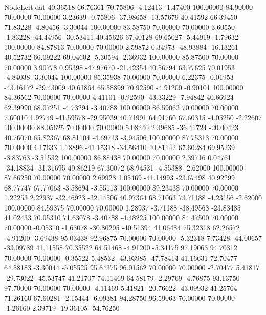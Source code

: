 \begin{filecontents}{NodeLeft.dat}
  40.36518   66.76361   70.75806    -4.12413   -1.47400  100.00000   84.90000   70.00000   70.00000    3.23639   -0.75806  -37.98658  -13.57679
  40.41592   66.39450   71.83228    -4.80456   -3.30044  100.00000   83.58750   70.00000   70.00000    3.60550   -1.83228  -44.44956  -30.53411
  40.45626   67.40128   69.65027    -5.44919   -1.79632  100.00000   84.87813   70.00000   70.00000    2.59872    0.34973  -48.93884  -16.13261
  40.52732   66.09222   69.04602    -5.30594   -2.36932  100.00000   85.87500   70.00000   70.00000    3.90778    0.95398  -47.97670  -21.42354
  40.56794   63.77625   70.01953    -4.84038   -3.30044  100.00000   85.35938   70.00000   70.00000    6.22375   -0.01953  -43.16172  -29.43009
  40.61864   65.58899   70.92590    -4.91200   -0.90101  100.00000   84.36562   70.00000   70.00000    4.41101   -0.92590  -43.33229   -7.94842
  40.66924   62.39990   68.07251    -4.73294   -3.40788  100.00000   86.59063   70.00000   70.00000    7.60010    1.92749  -41.59578  -29.95039
  40.71991   64.91760   67.60315    -4.05250   -2.22607  100.00000   88.05625   70.00000   70.00000    5.08240    2.39685  -36.41724  -20.00423
  40.76070   65.82367   68.81104    -4.69713   -3.94506  100.00000   87.75313   70.00000   70.00000    4.17633    1.18896  -41.15318  -34.56410
  40.81142   67.60284   69.95239    -3.83763   -3.51532  100.00000   86.88438   70.00000   70.00000    2.39716    0.04761  -34.18834  -31.31695
  40.86219   67.30072   68.94531    -4.55388   -2.62000  100.00000   87.66250   70.00000   70.00000    2.69928    1.05469  -41.14993  -23.67498
  40.92299   68.77747   67.77063    -3.58694   -3.55113  100.00000   89.23438   70.00000   70.00000    1.22253    2.22937  -32.46923  -32.14506
  40.97364   68.71063   73.71188    -4.23156   -2.62000  100.00000   84.59375   70.00000   70.00000    1.28937   -3.71188  -38.49563  -23.83485
  41.02433   70.05310   71.63078    -3.40788   -4.48225  100.00000   84.47500   70.00000   70.00000   -0.05310   -1.63078  -30.80295  -40.51394
  41.06484   75.32318   62.26572    -4.91200   -3.69438   95.03438   92.96875   70.00000   70.00000   -5.32318    7.73428  -44.00657  -33.09789
  41.11558   70.35522   64.51468    -4.91200   -5.34175   97.19063   94.70312   70.00000   70.00000   -0.35522    5.48532  -43.93985  -47.78414
  41.16631   72.70477   64.58183    -3.30044   -5.05525   95.64375   96.01562   70.00000   70.00000   -2.70477    5.41817  -29.73022  -45.53747
  41.21707   74.11469   64.58179    -2.29769   -4.76875   93.13750   97.70000   70.00000   70.00000   -4.11469    5.41821  -20.76622  -43.09932
  41.25764   71.26160   67.60281    -2.15444   -6.09381   94.28750   96.59063   70.00000   70.00000   -1.26160    2.39719  -19.36105  -54.76250

\end{filecontents}
